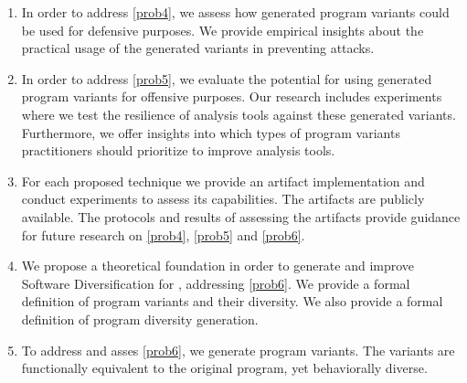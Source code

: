 \begin{enumerate}[label=\textbf{C\arabic*}, ref=C\arabic*]

	\item \label{defensivecontrib}  In order to address \ref{prob4}, we assess how generated \Wasm program variants could be used for defensive purposes. We provide empirical insights about the practical usage of the generated variants in preventing attacks.
	
	\item \label{ofensivecontrib}  
	In order to address \ref{prob5}, we evaluate the potential for using generated \Wasm program variants for offensive purposes. 
	Our research includes experiments where we test the resilience of \Wasm analysis tools against these generated variants. 
	Furthermore, we offer insights into which types of program variants practitioners should prioritize to improve \Wasm analysis tools.

	\item \label{methodcontrib}  For each proposed technique we provide an artifact implementation and conduct experiments to assess its capabilities. The artifacts are publicly available. The protocols and results of assessing the artifacts provide guidance for future research on \ref{prob4}, \ref{prob5} and \ref{prob6}.
	
	\item \label{therycontrib}  We propose a theoretical foundation in order to generate and improve Software Diversification for \Wasm, addressing \ref{prob6}. We provide a formal definition of \Wasm program variants and their diversity. We also provide a formal definition of \Wasm program diversity generation.
	
	\item \label{generationcontrib}  To address and asses \ref{prob6}, we generate \Wasm program variants. The variants are functionally equivalent to the original program, yet behaviorally diverse.
	

	
\end{enumerate}

